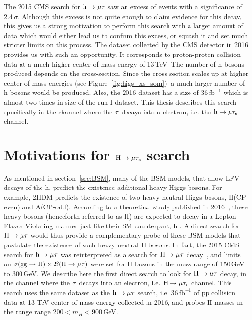 The 2015 CMS search for $\text{h} \to \mu \tau$ saw an excess of events with a significance of 2.4\,$\sigma$. Although this excess is not quite enough to claim evidence for this decay, this gives us a strong motivation to perform this search with a larger amount of data which would either lead us to confirm this excess, or squash it and set much stricter limits on this process. The dataset collected by the CMS detector in 2016 provides us with such an opportunity. It corresponds to proton-proton collision data at a much higher center-of-mass energy of 13\,TeV. The number of h bosons produced depends on the cross-section. Since the cross section scales up at higher center-of-mass energies (see Figure~\ref{fig:higs_xs_som}), a much larger number of h bosons would be produced. Also, the 2016 dataset has a size of 36\,$\mathrm{fb}^{-1}$ which is almost two times in size of the run I dataset. This thesis describes this search specifically in the channel where the $\tau$ decays into a electron, i.e. the $\text{h} \to \mu \tau_{e}$ channel.   

\section{Motivations for $\text{H} \to \mu \tau_{e}$ search}
As mentioned in section~\ref{sec:BSM}, many of the BSM models, that allow LFV decays of the h, predict the existence additional heavy Higgs bosons. For example, 2HDM predicts the existence of two heavy neutral Higgs bosons, H(CP-even) and A(CP-odd). According to a theoretical study published in 2016~\cite{PhysRevD.93.055021}, these heavy bosons (henceforth referred to as H) are expected to decay in a Lepton Flavor Violating manner just like their SM counterpart, h . A direct search for $\text{H} \to \mu \tau$ would thus provide a complementary probe of these BSM models that postulate the existence of such heavy neutral H bosons. In fact, the 2015 CMS search for $\text{h} \to \mu \tau$ was reinterpreted as a search for $\text{H} \to \mu \tau$ decay~\cite{Buschmann:2016pb}, and limits on $\sigma(\textrm{gg}\rightarrow \text{H})\times\mathcal{B}(\text{H} \to \mu \tau)$ were set for H bosons in the mass range of 150\,GeV to 300\,GeV. We describe here the first direct search to look for $\text{H} \to \mu \tau$ decay, in the channel where the $\tau$ decays into an electron, i.e. $\text{H} \to \mu \tau_{e}$ channel. This search uses the same dataset as the $\text{h} \to \mu \tau$ search, i.e. 36\,$\mathrm{fb}^{-1}$ of pp collision data at 13 TeV center-of-mass energy collected in 2016, and probes H masses in the range range $200<m_H<900$\,GeV. 

